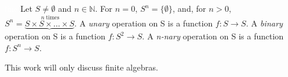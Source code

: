 \documentclass{../mcom-l}
\begin{document}


\begin{definition}\textcolor{white}{line}\newline
Let $S \neq \emptyset$ and $n \in \mathbb{N}$.\newline
For $n=0$, $S^n = \{ \emptyset \}$, and, for $n>0$, $S^n = \underbrace{S \times S \times \dots \times S}^{~n~\text{times}}$.\newline
A \emph{unary} operation on S is a function $f : S \to S$.\newline
A \emph{binary} operation on S is a function $f : S^2 \to S$.\newline
A \emph{n-nary} operation on S is a function $f : S^n \to S$.
\end{definition}

This work will only discuss finite algebras.
\end{document}
